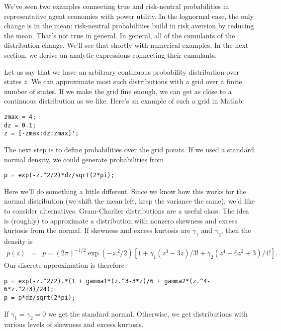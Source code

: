 \documentclass[11pt]{article}
\begin{document}
We've seen two examples connecting true and risk-neutral probabilities
in representative agent economies with power utility.
In the lognormal case, the only change is in the mean:  risk-neutral
probabilities build in risk aversion by reducing the mean.
That's not true in general.
In general, all of the cumulants of the distribution change.
We'll see that shortly with numerical examples.
In the next section, we derive an analytic expressions connecting
their cumulants.

Let us say that we have an arbitrary continuous probability distribution over states $z$.
We can approximate most such distributions with a grid over a finite number
of states.
If we make the grid fine enough, we can get as close to a continuous distribution
as we like.
Here's an example of such a grid in Matlab:
\begin{verbatim}
zmax = 4;
dz = 0.1;
z = [-zmax:dz:zmax]';
\end{verbatim}
The next step is to define probabilities over the grid points.
If we used a standard normal density, we could generate probabilities
from
\begin{verbatim}
p = exp(-z.^2/2)*dz/sqrt(2*pi);
\end{verbatim}
Here we'll do something a little different.
Since we know how this works for the normal distribution
(we shift the mean left, keep the variance the same),
we'd like to consider alternatives.
Gram-Charlier distributions are a useful class.
The idea is (roughly) to approximate a distribution
with nonzero skewness and excess kurtosis from the normal.
If skewness and excess kurtosis are $\gamma_1$ and $\gamma_2$,
then the density is
\begin{eqnarray*}
    p(z) &=& p = (2 \pi)^{-1/2} \exp(-z.^2/2)[1 + \gamma_1(z^3-3z)/3! + \gamma_2(z^4-6z^2+3)/4!] .
\end{eqnarray*}
Our discrete approximation is therefore
\begin{verbatim}
p = exp(-z.^2/2).*(1 + gamma1*(z.^3-3*z)/6 + gamma2*(z.^4-6*z.^2+3)/24);
p = p*dz/sqrt(2*pi);
\end{verbatim}
If $\gamma_1 = \gamma_2 = 0$ we get the standard normal.
Otherwise, we get distributions with various levels of skewness
and excess kurtosis.
\end{document}
